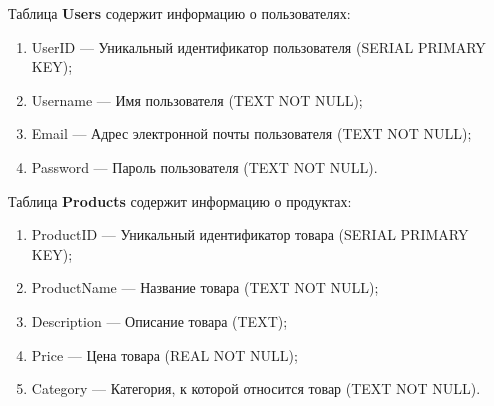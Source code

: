 \documentclass{bmstu}
\begin{document}







Таблица \textbf{Users} содержит информацию о пользователях:

\begin{enumerate}
    \item UserID --- Уникальный идентификатор пользователя (SERIAL PRIMARY KEY);
    \item Username --- Имя пользователя (TEXT NOT NULL);
    \item Email --- Адрес электронной почты пользователя (TEXT NOT NULL);
    \item Password --- Пароль пользователя (TEXT NOT NULL).
\end{enumerate}

Таблица \textbf{Products} содержит информацию о продуктах:

\begin{enumerate}
    \item ProductID --- Уникальный идентификатор товара (SERIAL PRIMARY KEY);
    \item ProductName --- Название товара (TEXT NOT NULL);
    \item Description --- Описание товара (TEXT);
    \item Price --- Цена товара (REAL NOT NULL);
    \item Category --- Категория, к которой относится товар (TEXT NOT NULL).
\end{enumerate}
\end{document}
